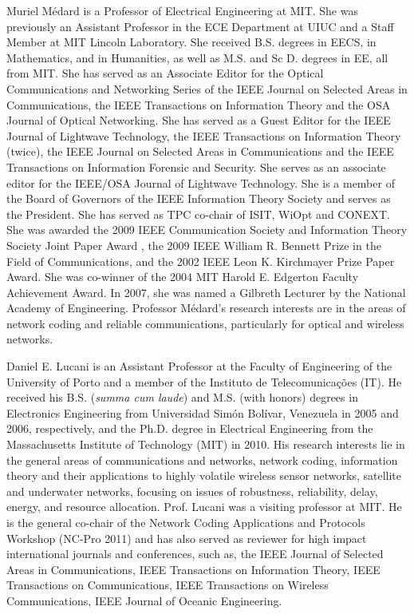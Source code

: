 \documentclass[journal, letterpaper]{IEEEtran}
\begin{document}
\begin{IEEEbiography}
{Muriel M\'edard} is a Professor of Electrical Engineering at MIT. She was previously an Assistant Professor in the ECE Department at UIUC and a Staff Member at MIT Lincoln Laboratory. She received B.S. degrees in EECS, in Mathematics, and in Humanities, as well as M.S. and Sc D. degrees in EE, all from MIT. She has served as an Associate Editor for the Optical Communications and Networking Series of the IEEE Journal on Selected Areas in Communications, the IEEE Transactions on Information Theory and the OSA Journal of Optical Networking. She has served as a Guest Editor for the IEEE Journal of Lightwave Technology, the IEEE Transactions on Information Theory
(twice), the IEEE Journal on Selected Areas in Communications and the IEEE Transactions on Information Forensic and Security. She serves as an associate editor for the IEEE/OSA Journal of Lightwave Technology. She is a member of the Board of Governors of the IEEE Information Theory Society and serves as the President. She has served as TPC co-chair of ISIT, WiOpt and CONEXT. She was awarded the 2009 IEEE Communication Society and Information Theory Society Joint Paper Award , the 2009 IEEE William R. Bennett Prize in the Field of Communications, and the 2002 IEEE Leon K. Kirchmayer Prize Paper Award. She was co-winner of the 2004 MIT Harold E. Edgerton Faculty Achievement Award. In 2007, she was named a Gilbreth Lecturer by the National Academy of Engineering. Professor M\'edard's research interests are in the areas of network coding and reliable communications, particularly for optical and wireless networks.
\end{IEEEbiography}

\begin{IEEEbiography}
{Daniel E. Lucani} is an Assistant Professor at the Faculty of Engineering of the University of Porto and a member of the Instituto de Telecomunica\c c\~oes (IT). He received his B.S.  (\textit{summa cum laude}) and M.S. (with honors) degrees in Electronics Engineering from Universidad Sim\'on Bol\'ivar, Venezuela in 2005 and 2006, respectively, and the Ph.D. degree in Electrical Engineering from the Massachusetts Institute of Technology (MIT) in 2010. His research interests lie in the general areas of communications and networks, network coding, information theory and their applications to highly volatile wireless sensor networks, satellite and underwater networks, focusing on issues of robustness, reliability, delay, energy, and resource allocation. Prof. Lucani was a visiting professor at MIT. He is the general co-chair of the Network Coding Applications and Protocols Workshop (NC-Pro 2011) and has also served as reviewer for high impact international journals and conferences, such as, the IEEE Journal of Selected Areas in Communications, IEEE Transactions on Information Theory, IEEE Transactions on Communications, IEEE Transactions on Wireless Communications, IEEE Journal of Oceanic Engineering.
\end{IEEEbiography}
\end{document}
